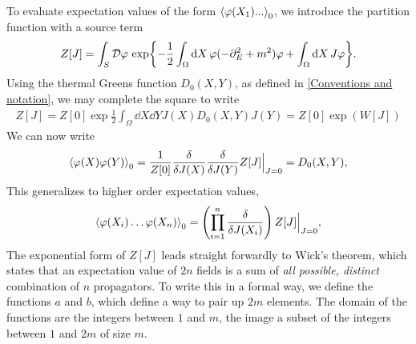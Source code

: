 
To evaluate expectation values of the form $\ex{\varphi(X_1) ... }_0$, we introduce the partition function with a source term
\begin{align}
    Z[J] = \int_S \mathcal{D} \varphi \, \exp{
        - \frac{1}{2} \int_\Omega \dd X \, \varphi (-\partial_E^2 + m^2) \varphi
        + \int_\Omega \dd X \, J \varphi
    }.
\end{align}
Using the thermal Greens function $D_0(X, Y)$, as defined in \autoref{Conventions and notation}, we may complete the square to write
\begin{align}
    Z[J] = Z[0]\exp{\frac{1}{2} \int_{\Omega} \dd X \dd Y J(X) D_0(X, Y) J(Y)}
    = Z[0] \exp(W[J])
\end{align}
We can now write
\begin{equation}
    \ex{\varphi(X)\varphi(Y)}_0 
    = \frac{1}{Z[0]}
    \frac{\delta}{\delta J(X)} \frac{\delta}{\delta J(Y)} 
    Z[J] \Big|_{J=0} 
    = D_0(X, Y),
\end{equation}
This generalizes to higher order expectation values,
\begin{equation}
    \ex{\varphi(X_i) \dots \varphi(X_n)}_0
    = \left(\prod_{i=1}^n \frac{\delta}{\delta J(X_i)}\right) 
    Z[J] \Big|_{J=0},
\end{equation}
The exponential form of $Z[J]$ leads straight forwardly to Wick's theorem, which states that an expectation value of $2n$ fields is a sum of \emph{all possible, distinct} combination of $n$ propagators.
To write this in a formal way, we define the functions $a$ and $b$, which define a way to pair up $2m$ elements.
The domain of the functions are the integers between $1$ and $m$, the image a subset of the integers between $1$ and $2m$ of size $m$.
